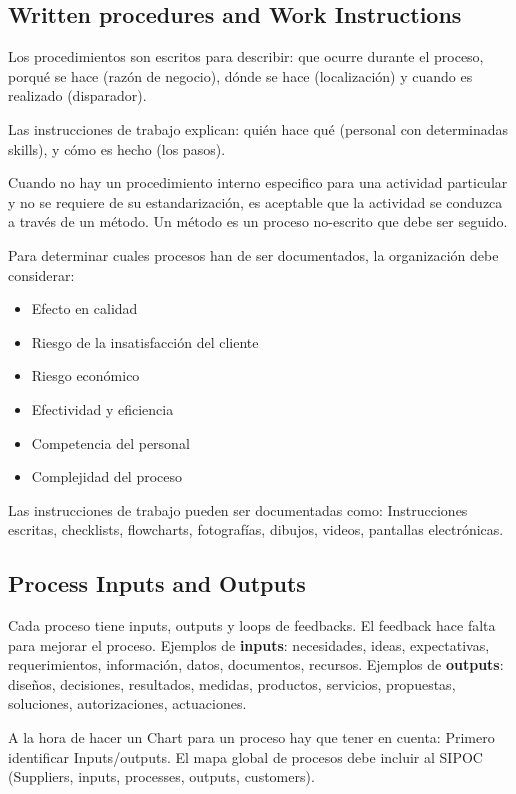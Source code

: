 \documentclass[]{article}
\begin{document}
\subsection{Written procedures and Work Instructions} 

Los procedimientos son escritos para describir: que ocurre durante el proceso, porqué se hace (razón de negocio), dónde se hace (localización) y cuando es realizado (disparador).

Las instrucciones de trabajo explican: quién hace qué (personal con determinadas skills), y cómo es hecho (los pasos). 

Cuando no hay un procedimiento interno especifico para una actividad particular y no se requiere de su estandarización, es aceptable que la actividad se conduzca a través de un método. Un método es un proceso no-escrito que debe ser seguido.

Para determinar cuales procesos han de ser documentados, la organización debe considerar: 

\begin{itemize}
	\item Efecto en calidad
	\item Riesgo de la insatisfacción del cliente
	\item Riesgo económico
	\item Efectividad y eficiencia
	\item Competencia del personal
	\item Complejidad del proceso
\end{itemize}

Las instrucciones de trabajo pueden ser documentadas como: Instrucciones escritas, checklists, flowcharts, fotografías, dibujos, videos, pantallas electrónicas.

\subsection{Process Inputs and Outputs}

Cada proceso tiene inputs, outputs y loops de feedbacks. El feedback hace falta para mejorar el proceso. Ejemplos de \textbf{inputs}: necesidades, ideas, expectativas, requerimientos, información, datos, documentos, recursos. Ejemplos de \textbf{outputs}: diseños, decisiones, resultados, medidas, productos, servicios, propuestas, soluciones, autorizaciones, actuaciones.

A la hora de hacer un Chart para un proceso hay que tener en cuenta: Primero identificar Inputs/outputs. El mapa global de procesos debe incluir al SIPOC (Suppliers, inputs, processes, outputs, customers). 
\end{document}
